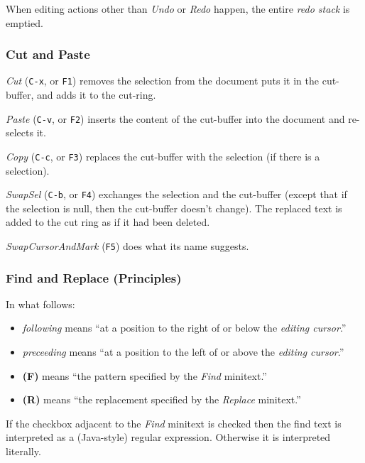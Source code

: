 \documentclass[12pt,a4paper]{article}
\begin{document}
When editing actions other than \emph{Undo} or \emph{Redo} happen, the
entire \emph{redo stack} is emptied.

\hypertarget{cut-and-paste}{%
\subsubsection{Cut and Paste}\label{cut-and-paste}}

\emph{Cut} (\texttt{C-x}, or \texttt{F1}) removes the selection from the
document puts it in the cut-buffer, and adds it to the cut-ring.

\emph{Paste} (\texttt{C-v}, or \texttt{F2}) inserts the content of the
cut-buffer into the document and re-selects it.

\emph{Copy} (\texttt{C-c}, or \texttt{F3}) replaces the cut-buffer with
the selection (if there is a selection).

\emph{SwapSel} (\texttt{C-b}, or \texttt{F4}) exchanges the selection
and the cut-buffer (except that if the selection is null, then the
cut-buffer doesn't change). The replaced text is added to the cut ring
as if it had been deleted.

\emph{SwapCursorAndMark} (\texttt{F5}) does what its name suggests.

\hypertarget{find-and-replace-principles}{%
\subsubsection{Find and Replace
(Principles)}\label{find-and-replace-principles}}

In what follows:

\begin{itemize}
\item
  \emph{following} means ``at a position to the right of or below the
  \emph{editing cursor}.''
\item
  \emph{preceeding} means ``at a position to the left of or above the
  \emph{editing cursor}.''
\item
  \textbf{(F)} means ``the pattern specified by the \emph{Find}
  minitext.''
\item
  \textbf{(R)} means ``the replacement specified by the \emph{Replace}
  minitext.''
\end{itemize}

If the checkbox adjacent to the \emph{Find} minitext is checked then the
find text is interpreted as a (Java-style) regular expression. Otherwise
it is interpreted literally.
\end{document}
